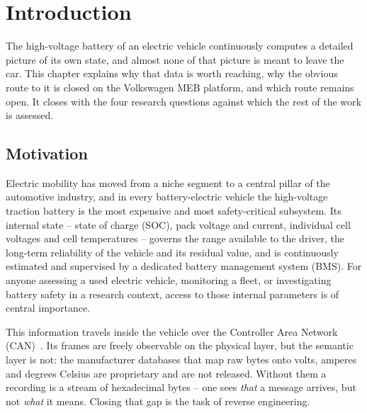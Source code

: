 \documentclass[11pt,a4paper,oneside,parskip=half]{scrreprt}
\begin{document}
\clearpage
{}
\setcounter{page}{1}


\chapter{Introduction}
The high-voltage battery of an electric vehicle continuously computes a detailed picture of its own state, and almost none of that picture is meant to leave the car. This chapter explains why that data is worth reaching, why the obvious route to it is closed on the Volkswagen MEB platform, and which route remains open. It closes with the four research questions against which the rest of the work is assessed.

\section{Motivation}
Electric mobility has moved from a niche segment to a central pillar of the automotive industry, and in every battery-electric vehicle the high-voltage traction battery is the most expensive and most safety-critical subsystem. Its internal state -- state of charge (SOC), pack voltage and current, individual cell voltages and cell temperatures -- governs the range available to the driver, the long-term reliability of the vehicle and its residual value, and is continuously estimated and supervised by a dedicated battery management system (BMS). For anyone assessing a used electric vehicle, monitoring a fleet, or investigating battery safety in a research context, access to those internal parameters is of central importance.

This information travels inside the vehicle over the Controller Area Network (CAN)~\cite{iso11898}. Its frames are freely observable on the physical layer, but the semantic layer is not: the manufacturer databases that map raw bytes onto volts, amperes and degrees Celsius are proprietary and are not released. Without them a recording is a stream of hexadecimal bytes -- one sees \emph{that} a message arrives, but not \emph{what} it means. Closing that gap is the task of reverse engineering.
\end{document}
